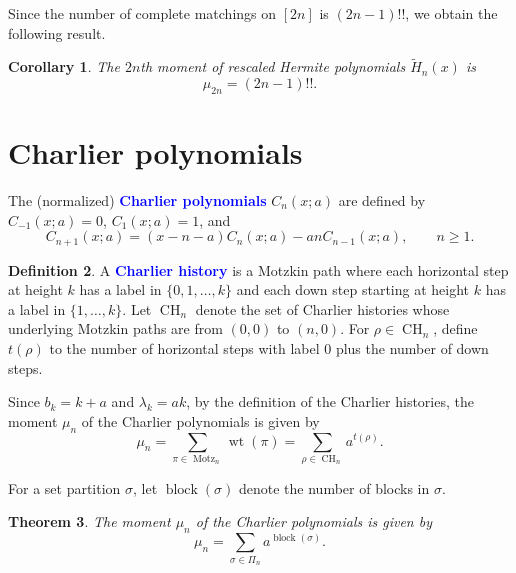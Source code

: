 \documentclass[oneside]{book}
\numberwithin{equation}{section}
\newtheorem{thm}{Theorem}[section]
\newtheorem{cor}[thm]{Corollary}
\theoremstyle{definition}
\newtheorem{defn}[thm]{Definition}
\newcommand\block{\operatorname{block}}
\newcommand\CH{\operatorname{CH}}
\newcommand\Motz{\operatorname{Motz}}
\newcommand\wt{\operatorname{wt}}
\renewcommand\emph[1]{\textcolor{blue}{\bf #1}}
\begin{document}
Since the number of complete matchings on \( [2n] \) is
\( (2n-1)!! \), we obtain the following result.

\begin{cor}
  The \( 2n \)th moment of rescaled Hermite polynomials
  \( \widetilde{H}_n(x) \) is
  \[
    \mu_{2n} = (2n-1)!!.
  \]
\end{cor}


\section{Charlier polynomials}

The (normalized) \emph{Charlier polynomials}
\( C_n(x;a) \) are defined by
\( C_{-1}(x;a) =0 \), \( C_{1}(x;a) =1 \), and
\[
  C_{n+1}(x;a) = (x-n-a) C_n(x;a) - an C_{n-1}(x;a), \qquad n\ge1.
\]

\begin{defn}
  A \emph{Charlier history} is a Motzkin path where each horizontal
  step at height \( k \) has a label in \( \{0,1,\dots,k\} \) and each
  down step starting at height \( k \) has a label in
  \( \{1,\dots,k\} \). Let \( \CH_{n} \) denote the set of
  Charlier histories whose underlying Motzkin paths are from
  \( (0,0) \) to \( (n,0) \).
  For \( \rho\in \CH_{n} \), define \( t(\rho) \)
  to the number of horizontal steps with label \( 0 \)
  plus the number of down steps.
\end{defn}

Since \( b_k = k+a \) and \( \lambda_k = ak \), by the definition of
the Charlier histories, the moment \( \mu_n \) of the Charlier
polynomials is given by
\[
  \mu_n = \sum_{\pi\in \Motz_n} \wt(\pi) = \sum_{\rho\in \CH_n}
  a^{t(\rho)}.
\]

For a set partition \( \sigma \), let \( \block(\sigma) \) denote the
number of blocks in \( \sigma \).

\begin{thm}
  The moment \( \mu_n \) of the Charlier polynomials is given by
\[
  \mu_n = \sum_{\sigma\in \Pi_n} a^{\block(\sigma)}.
\]
\end{thm}
\end{document}
